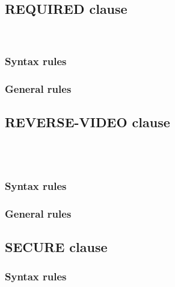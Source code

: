 \subsection{REQUIRED clause}

\begin{syntax}
  \begin{1=}
     \\
  \end{1=}
\end{syntax}

\subsubsection{Syntax rules}

\subsubsection{General rules}

\subsection{REVERSE-VIDEO clause}

\begin{syntax}
  \begin{1=}
     \\
     \\
  \end{1=}
\end{syntax}

\subsubsection{Syntax rules}

\subsubsection{General rules}

\subsection{SECURE clause}

\begin{syntax}
\end{syntax}

\subsubsection{Syntax rules}

